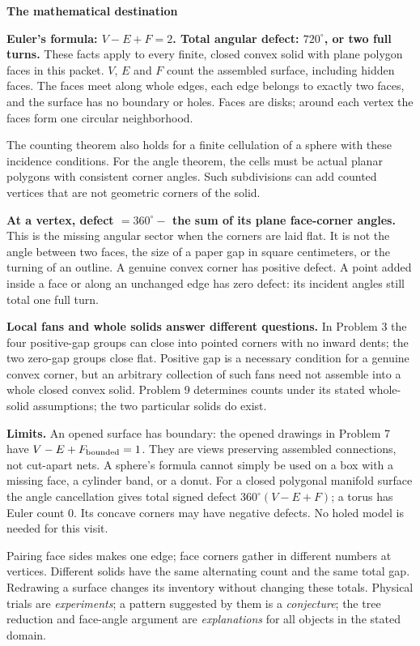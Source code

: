 \documentclass[11pt,letterpaper]{article}
\newcommand{\titleline}[1]{\par{\Large\bfseries #1}\par\vspace{4pt}}
\newcommand{\sub}[1]{\par\vspace{3pt}{\bfseries #1}\par}
\newcommand{\degc}{^{\circ}}
\begin{document}
\titleline{The mathematical destination}
\textbf{Euler's formula: $V-E+F=2$. Total angular defect: $720\degc$, or two full turns.} These facts apply to every finite, closed convex solid with plane polygon faces in this packet. $V$, $E$ and $F$ count the assembled surface, including hidden faces. The faces meet along whole edges, each edge belongs to exactly two faces, and the surface has no boundary or holes. Faces are disks; around each vertex the faces form one circular neighborhood.

The counting theorem also holds for a finite cellulation of a sphere with these incidence conditions. For the angle theorem, the cells must be actual planar polygons with consistent corner angles. Such subdivisions can add counted vertices that are not geometric corners of the solid.

\textbf{At a vertex, defect $=360\degc-$ the sum of its plane face-corner angles.} This is the missing angular sector when the corners are laid flat. It is not the angle between two faces, the size of a paper gap in square centimeters, or the turning of an outline. A genuine convex corner has positive defect. A point added inside a face or along an unchanged edge has zero defect: its incident angles still total one full turn.

\textbf{Local fans and whole solids answer different questions.} In Problem 3 the four positive-gap groups can close into pointed corners with no inward dents; the two zero-gap groups close flat. Positive gap is a necessary condition for a genuine convex corner, but an arbitrary collection of such fans need not assemble into a whole closed convex solid. Problem 9 determines counts under its stated whole-solid assumptions; the two particular solids do exist.

\textbf{Limits.} An opened surface has boundary: the opened drawings in Problem 7 have $V-E+F_{\rm bounded}=1$. They are views preserving assembled connections, not cut-apart nets. A sphere's formula cannot simply be used on a box with a missing face, a cylinder band, or a donut. For a closed polygonal manifold surface the angle cancellation gives total signed defect $360\degc(V-E+F)$; a torus has Euler count 0. Its concave corners may have negative defects. No holed model is needed for this visit.

\sub{What children are meant to discover}
Pairing face sides makes one edge; face corners gather in different numbers at vertices. Different solids have the same alternating count and the same total gap. Redrawing a surface changes its inventory without changing these totals. Physical trials are \emph{experiments}; a pattern suggested by them is a \emph{conjecture}; the tree reduction and face-angle argument are \emph{explanations} for all objects in the stated domain.
\end{document}
